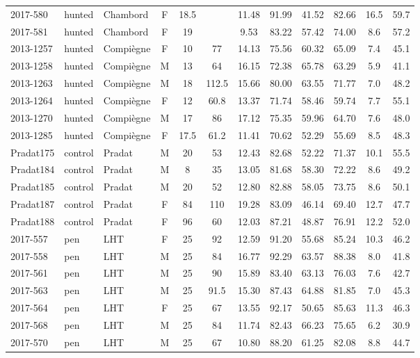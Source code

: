 \documentclass[12pt,a4paper]{article}
\begin{document}
\begin{landscape}
\begin{table}[!htbp]
\begin{tabular}{@{}lllccccccccc@{}}
    2017-580 & hunted & Chambord & F & 18.5 & ~ & 11.48 & 91.99 & 41.52 & 82.66 & 16.5 & 59.7 \\
    2017-581 & hunted & Chambord & F & 19 & ~ & 9.53 & 83.22 & 57.42 & 74.00 & 8.6 & 57.2 \\
    2013-1257 & hunted & Compiègne & F & 10 & 77 & 14.13 & 75.56 & 60.32 & 65.09 & 7.4 & 45.1 \\
    2013-1258 & hunted & Compiègne & M & 13 & 64 & 16.15 & 72.38 & 65.78 & 63.29 & 5.9 & 41.1 \\
    2013-1263 & hunted & Compiègne & M & 18 & 112.5 & 15.66 & 80.00 & 63.55 & 71.77 & 7.0 & 48.2 \\
    2013-1264 & hunted & Compiègne & F & 12 & 60.8 & 13.37 & 71.74 & 58.46 & 59.74 & 7.7 & 55.1 \\
    2013-1270 & hunted & Compiègne & M & 17 & 86 & 17.12 & 75.35 & 59.96 & 64.70 & 7.6 & 48.0 \\
    2013-1285 & hunted & Compiègne & F & 17.5 & 61.2 & 11.41 & 70.62 & 52.29 & 55.69 & 8.5 & 48.3 \\
    Pradat175 & control & Pradat & M & 20 & 53 & 12.43 & 82.68 & 52.22 & 71.37 & 10.1 & 55.5 \\
    Pradat184 & control & Pradat & M & 8 & 35 & 13.05 & 81.68 & 58.30 & 72.22 & 8.6 & 49.2 \\
    Pradat185 & control & Pradat & M & 20 & 52 & 12.80 & 82.88 & 58.05 & 73.75 & 8.6 & 50.1 \\
    Pradat187 & control & Pradat & F & 84 & 110 & 19.28 & 83.09 & 46.14 & 69.40 & 12.7 & 47.7 \\
    Pradat188 & control & Pradat & F & 96 & 60 & 12.03 & 87.21 & 48.87 & 76.91 & 12.2 & 52.0 \\
    2017-557 & pen & LHT & F & 25 & 92 & 12.59 & 91.20 & 55.68 & 85.24 & 10.3 & 46.2 \\
    2017-558 & pen & LHT & M & 25 & 84 & 16.77 & 92.29 & 63.57 & 88.38 & 8.0 & 41.8 \\
    2017-561 & pen & LHT & M & 25 & 90 & 15.89 & 83.40 & 63.13 & 76.03 & 7.6 & 42.7 \\
    2017-563 & pen & LHT & M & 25 & 91.5 & 15.30 & 87.43 & 64.88 & 81.85 & 7.0 & 45.3 \\
    2017-564 & pen & LHT & F & 25 & 67 & 13.55 & 92.17 & 50.65 & 85.63 & 11.3 & 46.3 \\
    2017-568 & pen & LHT & M & 25 & 84 & 11.74 & 82.43 & 66.23 & 75.65 & 6.2 & 30.9 \\
    2017-570 & pen & LHT & M & 25 & 67 & 10.80 & 88.20 & 61.25 & 82.08 & 8.8 & 44.7 \\

\end{tabular}
\end{table}
\end{landscape}
\end{document}
